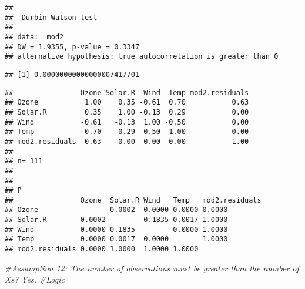 \documentclass[]{article}
\newenvironment{Shaded}{\begin{snugshade}}{\end{snugshade}}
\newcommand{\CommentTok}[1]{\textcolor[rgb]{0.56,0.35,0.01}{\textit{#1}}}
\newcommand{\DataTypeTok}[1]{\textcolor[rgb]{0.13,0.29,0.53}{#1}}
\newcommand{\KeywordTok}[1]{\textcolor[rgb]{0.13,0.29,0.53}{\textbf{#1}}}
\newcommand{\NormalTok}[1]{#1}
\newcommand{\OperatorTok}[1]{\textcolor[rgb]{0.81,0.36,0.00}{\textbf{#1}}}
\newcommand{\StringTok}[1]{\textcolor[rgb]{0.31,0.60,0.02}{#1}}
\begin{document}
\begin{verbatim}
## 
##  Durbin-Watson test
## 
## data:  mod2
## DW = 1.9355, p-value = 0.3347
## alternative hypothesis: true autocorrelation is greater than 0
\end{verbatim}

\begin{Shaded}
\end{Shaded}

\begin{verbatim}
## [1] 0.00000000000000007417701
\end{verbatim}

\begin{Shaded}
\end{Shaded}

\begin{verbatim}
##                Ozone Solar.R  Wind  Temp mod2.residuals
## Ozone           1.00    0.35 -0.61  0.70           0.63
## Solar.R         0.35    1.00 -0.13  0.29           0.00
## Wind           -0.61   -0.13  1.00 -0.50           0.00
## Temp            0.70    0.29 -0.50  1.00           0.00
## mod2.residuals  0.63    0.00  0.00  0.00           1.00
## 
## n= 111 
## 
## 
## P
##                Ozone  Solar.R Wind   Temp   mod2.residuals
## Ozone                 0.0002  0.0000 0.0000 0.0000        
## Solar.R        0.0002         0.1835 0.0017 1.0000        
## Wind           0.0000 0.1835         0.0000 1.0000        
## Temp           0.0000 0.0017  0.0000        1.0000        
## mod2.residuals 0.0000 1.0000  1.0000 1.0000
\end{verbatim}

\begin{Shaded}
\begin{Highlighting}[]
\CommentTok{#Assumption 12: The number of observations must be greater than the number of Xs? Yes.}
\CommentTok{#Logic}
\end{Highlighting}
\end{Shaded}
\end{document}
